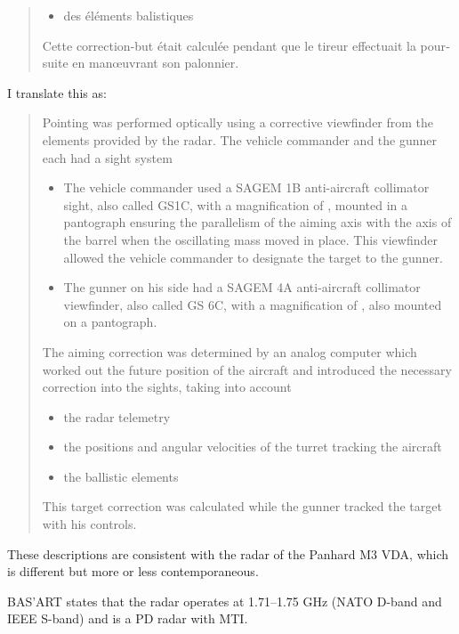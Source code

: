 \begin{withcounters}
{\begin{quote}
\begin{otherlanguage}{french}
\begin{itemize}
                    \item des éléments balistiques
                \end{itemize}
                Cette correction-but était calculée pendant que le tireur effectuait la poursuite en
                manœuvrant son palonnier.
            \end{otherlanguage}
        \end{quote}
        I translate this as:
        \begin{quote}
            Pointing was performed optically using a corrective viewfinder from the elements provided by the radar. The vehicle commander and the gunner each had a sight system
            \begin{itemize}
                \item The vehicle commander used a SAGEM 1B anti-aircraft collimator sight, also called GS1C, with a magnification of , mounted in a pantograph ensuring the parallelism of the aiming axis with the axis of the barrel when the oscillating mass moved in place. This viewfinder allowed the vehicle commander to designate the target to the gunner.
                \item  The gunner on his side had a SAGEM 4A anti-aircraft collimator viewfinder, also called GS 6C, with a magnification of , also mounted on a pantograph.
            \end{itemize}
            The aiming correction was determined by an analog computer which worked out the future position of the aircraft and introduced the necessary correction into the sights, taking into account
            \begin{itemize}
                \item the radar telemetry
                \item the positions and angular velocities of the turret tracking the aircraft
                \item the ballistic elements
            \end{itemize}
            This target correction was calculated while the gunner tracked the target with his controls.
        \end{quote}
        These descriptions are consistent with the radar of the Panhard M3 VDA, which is different but more or less contemporaneous.

        BAS'ART states that the radar operates at 1.71--1.75 GHz (NATO D-band and IEEE S-band) and is a PD radar with MTI.

}
\end{withcounters}
